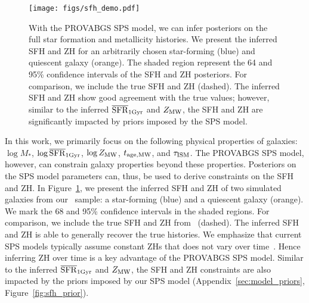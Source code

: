 \begin{figure}
\begin{center}
\texttt{[image: figs/sfh\_demo.pdf]}
    \caption{
        With the {\sc PROVABGS} SPS model, we can infer posteriors on the full
        star formation and metallicity histories. 
        We present the inferred SFH and ZH for an arbitrarily chosen
        star-forming (blue) and quiescent galaxy (orange).
        The shaded region represent the 64 and 95\% confidence intervals of the
        SFH and ZH posteriors. 
        For comparison, we include the true SFH and ZH (dashed). 
        The inferred SFH and ZH show good agreement with the true values;
        however, similar to the inferred $\overline{\rm SFR}_{\rm 1Gyr}$ and $Z_{\rm MW}$, the SFH and ZH
        are significantly impacted by priors imposed by the SPS model. 
    } \label{fig:sfh_demo}
\end{center}
\end{figure}

In this work, we primarily focus on the following physical properties of
galaxies: $\log M_*$, $\log\overline{\rm SFR}_{\rm 1Gyr}$, $\log Z_{\rm MW}$, $t_{\rm age, MW}$, and $\tau_{\rm ISM}$. 
The {\sc PROVABGS} SPS model, however, can constrain galaxy properties beyond
these properties. 
Posteriors on the SPS model parameters can, thus, be used to derive constraints
on the SFH and ZH. 
In Figure~\ref{fig:sfh_demo}, we present the inferred SFH and ZH of two
simulated galaxies from our \lgal~sample: a star-forming (blue) and a quiescent
galaxy (orange). 
We mark the 68 and 95\% confidence intervals in the shaded regions. 
For comparison, we include the true SFH and ZH from \lgal~(dashed).  
The inferred SFH and ZH is able to generally recover the true histories. 
We emphasize that current SPS models typically assume constant ZHs that does
not vary over time~\citep{carnall2019a, leja2019}. 
Hence inferring ZH over time is a key advantage of the {\sc PROVABGS} SPS
model. 
Similar to the inferred $\overline{\rm SFR}_{\rm 1Gyr}$ and $Z_{\rm MW}$, the SFH and ZH constraints are
also impacted by the priors imposed by our SPS model
(Appendix~\ref{sec:model_priors}, Figure~\ref{fig:sfh_prior}).

